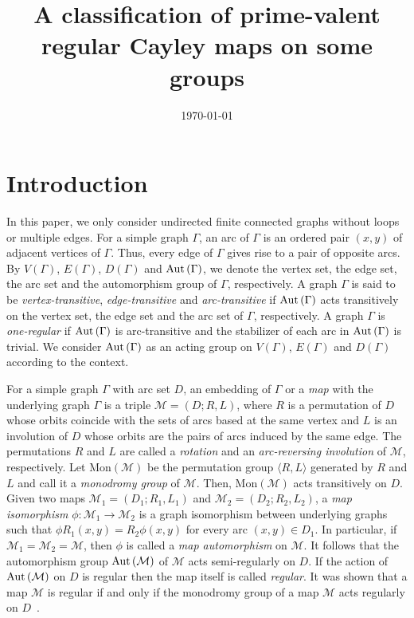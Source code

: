 \documentclass[12pt]{amsart}
\begin{document}
\title[prime-valent regular Cayley maps]{A classification of prime-valent regular Cayley maps on some groups}

\date{\today}
\maketitle

\section{ Introduction}

In this paper, we only consider undirected finite connected graphs
without loops or multiple edges.  For a simple graph $\Gamma$, an
arc of $\Gamma$ is an ordered pair $(x,y)$ of adjacent vertices of
$\Gamma$. Thus, every edge of $\Gamma$ gives rise to a pair of
opposite arcs. By $V(\Gamma)$, $E(\Gamma)$, $D(\Gamma)$ and ${\mbox{\rm Aut\,}}
(\Gamma)$, we denote the vertex set, the edge set, the arc set and
the automorphism group of $\Gamma$, respectively.  A graph
$\Gamma$ is said to be \emph{vertex-transitive},
\emph{edge-transitive} and \emph{arc-transitive} if ${\mbox{\rm Aut\,}}
(\Gamma)$ acts transitively on the vertex set, the edge set and
the arc set of $\Gamma$, respectively. A graph $\Gamma$ is
\emph{one-regular} if ${\mbox{\rm Aut\,}} (\Gamma)$ is arc-transitive and the
stabilizer of each arc in ${\mbox{\rm Aut\,}}(\Gamma)$ is trivial.  We consider
${\mbox{\rm Aut\,}}(\Gamma)$ as an acting group on $V(\Gamma)$, $E(\Gamma)$ and
$D(\Gamma)$ according to the context.

For a simple graph $\Gamma$ with arc set $D$, an embedding of
$\Gamma$ or a \emph{map} with the underlying graph $\Gamma$ is  a
triple $\mathcal{M}=(D;R,L)$, where $R$ is a permutation of $D$
whose orbits coincide with the sets of arcs based at the same
vertex and $L$ is an involution of $D$ whose orbits are the pairs
of arcs induced by the same edge. The permutations $R$ and $L$ are
called a \emph{rotation} and an \emph{arc-reversing involution} of
$\mathcal{M}$, respectively. Let Mon$(\mathcal{M})$ be the
permutation group $\langle R,L\rangle$ generated by $R$ and $L$
and call it a \emph{monodromy group} of $\mathcal{M}$. Then,
Mon$(\mathcal{M})$ acts transitively on $D$.  Given two maps
$\mathcal{M}_1=(D_1;R_1,L_1)$ and $\mathcal{M}_2=(D_2;R_2,L_2)$, a
\emph{map isomorphism} $\phi : \mathcal{ M}_1 \rightarrow
\mathcal{ M}_2$ is a graph isomorphism between underlying graphs
such that $\phi R_1(x,y)=R_2\phi(x,y)$ for every arc $(x,y) \in
D_1$. In particular, if $\mathcal{ M}_1 = \mathcal{ M}_2 =
\mathcal{ M}$, then $\phi$ is called a \emph{map automorphism} on
$\mathcal{M}$. It follows that the automorphism group
${\mbox{\rm Aut\,}}(\mathcal{M})$ of $\mathcal{M}$ acts semi-regularly on $D$.
If the action of ${\mbox{\rm Aut\,}}(\mathcal{M})$ on $D$ is regular then the
map itself is called \emph{regular}. It was shown that a map
$\mathcal{M}$ is regular if and only if the monodromy group of a
map $\mathcal{M}$ acts regularly on $D$~\cite{N}.
\end{document}
